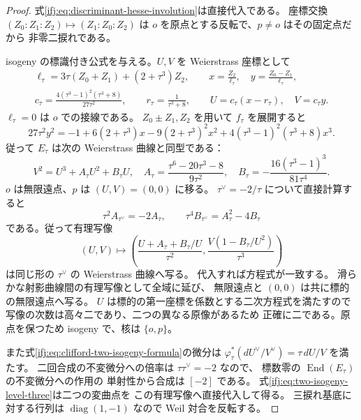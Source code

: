 \begin{proof}
式\eqref{ifj:eq:discriminant-hesse-involution}は直接代入である。
座標交換 $(Z_0:Z_1:Z_2)\mapsto(Z_1:Z_0:Z_2)$ は
$o$ を原点とする反転で、$p\ne o$ はその固定点だから
非零二捩れである。

isogeny の標識付き公式を与える。$U,V$ を Weierstrass 座標として
\[
 \begin{gathered}
 \ell_\tau=3\tau(Z_0+Z_1)+(2+\tau^3)Z_2,\qquad
 x=\frac{Z_2}{\ell_\tau},\quad y=\frac{Z_0-Z_1}{\ell_\tau},\\
 c_\tau=\frac{4(\tau^3-1)^2(\tau^3+8)}{27\tau^2},\qquad
 r_\tau=\frac1{\tau^3+8},\qquad
 U=c_\tau(x-r_\tau),\quad V=c_\tau y.
 \end{gathered}
\]
$\ell_\tau=0$ は $o$ での接線である。
$Z_0\pm Z_1,Z_2$ を用いて $f_\tau$ を展開すると
\[
 27\tau^2y^2=-1+6(2+\tau^3)x
 -9(2+\tau^3)^2x^2+
 4(\tau^3-1)^2(\tau^3+8)x^3.
\]
従って $E_\tau$ は次の Weierstrass 曲線と同型である：
\begin{equation}\label{ifj:eq:clifford-two-isogeny-weierstrass}
 V^2=U^3+A_\tau U^2+B_\tau U,\quad
 A_\tau=\frac{\tau^6-20\tau^3-8}{9\tau^2},\quad
 B_\tau=-\frac{16(\tau^3-1)^3}{81\tau^4}.
\end{equation}
$o$ は無限遠点、$p$ は $(U,V)=(0,0)$ に移る。
$\tau^\vee=-2/\tau$ について直接計算すると
\begin{equation}\label{ifj:eq:clifford-two-isogeny-relations}
 \tau^2 A_{\tau^\vee}=-2A_\tau,\qquad
 \tau^4 B_{\tau^\vee}=A_\tau^2-4B_\tau
\end{equation}
である。従って有理写像
\begin{equation}\label{ifj:eq:clifford-two-isogeny-formula}
 (U,V)\longmapsto
 \left(\frac{U+A_\tau+B_\tau/U}{\tau^2},
       \frac{V(1-B_\tau/U^2)}{\tau^3}\right)
\end{equation}
は同じ形の $\tau^\vee$ の Weierstrass 曲線へ写る。
代入すれば方程式が一致する。
滑らかな射影曲線間の有理写像として全域に延び、
無限遠点と $(0,0)$ は共に標的の無限遠点へ写る。
$U$ は標的の第一座標を係数とする二次方程式を満たすので
写像の次数は高々二であり、二つの異なる原像があるため
正確に二である。原点を保つため isogeny で、核は $\{o,p\}$。

また式\eqref{ifj:eq:clifford-two-isogeny-formula}の微分は
$\varphi_\tau^*(dU^\vee/V^\vee)=\tau\,dU/V$ を満たす。
二回合成の不変微分への倍率は $\tau\tau^\vee=-2$ なので、
標数零の $\operatorname{End}(E_\tau)$ の不変微分への作用の
単射性から合成は $[-2]$ である。
式\eqref{ifj:eq:two-isogeny-level-three}は二つの変曲点を
この有理写像へ直接代入して得る。
三捩れ基底に対する行列は $\operatorname{diag}(1,-1)$ なので
Weil 対合を反転する。
\end{proof}

